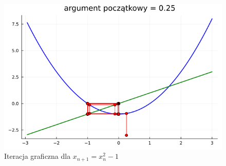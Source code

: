 \documentclass{article}
\begin{document}
\begin{figure}[h!]
    \includegraphics[scale=0.39]{plots/x^2-1:0.25.png}
    \caption{Iteracja graficzna dla $x_{n+1} = x_n^2 - 1$}
\end{figure}
\end{document}
